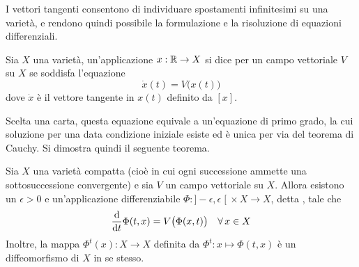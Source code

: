 I vettori tangenti consentono di individuare spostamenti infinitesimi su una varietà, e rendono quindi possibile la formulazione e la risoluzione di equazioni differenziali.

\begin{definition}
  Sia $X$ una varietà, un'applicazione $x:\mathbb{R} \to X$ si dice  per un campo vettoriale $V$ su $X$ se soddisfa l'equazione \begin{equation*}
  \dot{x}(t) = V\big(x(t)\big)
  \end{equation*} 
  dove $\dot{x}$ è il vettore tangente in $x(t)$ definito da $[x]$.
\end{definition}
\begin{remark}
  Scelta una carta, questa equazione equivale a un'equazione di primo grado, la cui soluzione per una data condizione iniziale esiste ed è unica per via del teorema di Cauchy. Si dimostra quindi il seguente teorema.
\end{remark}
\begin{theorem}
  Sia $X$ una varietà compatta (cioè in cui ogni successione ammette una sottosuccessione convergente) e sia $V$ un campo vettoriale su $X$. Allora esistono un $\epsilon > 0$ e un'applicazione differenziabile $\Phi:]-\epsilon, \epsilon\;[\ \times X \to X$, detta , tale che \begin{equation*}
  \dv{t} \Phi(t,x) = V\big( \Phi(x,t)\big) \quad \forall\, x \in  X
  \end{equation*} 
  Inoltre, la mappa $\Phi^t(x):X \to X$ definita da $\Phi^t:x \mapsto \Phi(t,x)$ è un diffeomorfismo di $X$ in se stesso.
\end{theorem}

